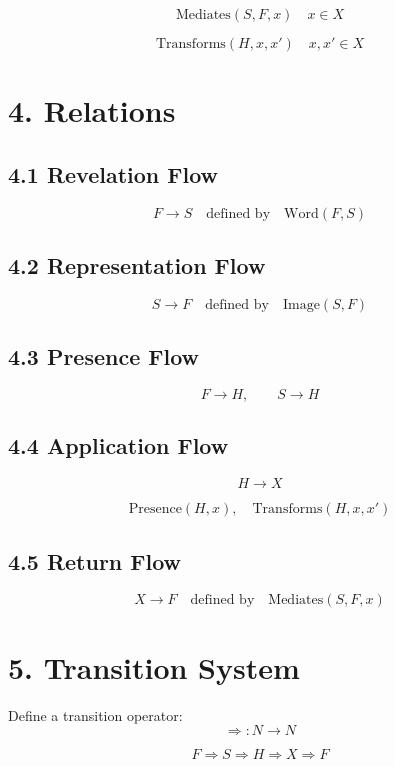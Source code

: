 \documentclass[12pt]{article}
\begin{document}
\[
\mathrm{Mediates}(S, F, x) \quad x \in X
\]

\[
\mathrm{Transforms}(H, x, x') \quad x, x' \in X
\]

\section*{4. Relations}

\subsection*{4.1 Revelation Flow}

\[
F \rightarrow S \quad \text{defined by} \quad \mathrm{Word}(F,S)
\]

\subsection*{4.2 Representation Flow}

\[
S \rightarrow F \quad \text{defined by} \quad \mathrm{Image}(S,F)
\]

\subsection*{4.3 Presence Flow}

\[
F \rightarrow H, \qquad S \rightarrow H
\]

\subsection*{4.4 Application Flow}

\[
H \rightarrow X
\]

\[
\mathrm{Presence}(H,x), \quad \mathrm{Transforms}(H,x,x')
\]

\subsection*{4.5 Return Flow}

\[
X \rightarrow F \quad \text{defined by} \quad \mathrm{Mediates}(S,F,x)
\]

\section*{5. Transition System}

Define a transition operator:
\[
\Rightarrow : N \rightarrow N
\]

\[
F \Rightarrow S \Rightarrow H \Rightarrow X \Rightarrow F
\]
\end{document}
